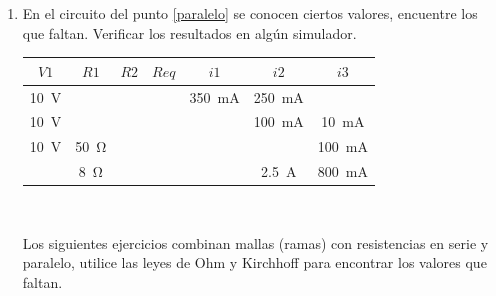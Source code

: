 \documentclass{article}
\begin{document}
\begin{enumerate}[label=\textbf{A.\arabic*}]
\begin{tabular}{|c|c|c|c|m{1.5cm}|c|c|}
\end{tabular}
\item En el circuito del punto \ref{paralelo} se conocen ciertos valores, encuentre los que faltan. Verificar los resultados en algún simulador. \\
\begin{tabular}{|c|c|m{0.8cm}|c|c|c|c|}
	\hline
	\rowcolor{headergray}
	${V1}$&$ {R1}$ &${R2}$ &$ {Req}$ & \quad ${{i}1}$ &$  {{i}2}$ &$ {{i}3} $\\ \hline
	\SI{10}{\volt}& & & & \SI{350}{\milli\ampere}&\SI{250}{\milli\ampere}& \\ \hline
	\SI{10}{\volt}& & & & &\SI{100}{\milli\ampere}&\SI{10}{\milli\ampere} \\ \hline
	\SI{10}{\volt}&\SI{50}{\ohm} & & & &&\SI{100}{\milli\ampere} \\ \hline
	 &\SI{8}{\ohm} & & & &\SI{2,5}{\ampere}&\SI{800}{\milli\ampere} \\ \hline
\end{tabular}
\\

\begin{tcolorbox}[enhanced,attach boxed title to top center={yshift=-3mm,yshifttext=-1mm},
	colback=black!5!white,colframe=white!75!black,colbacktitle=red!80!black,
	title= Atención , fonttitle=\bfseries,
	boxed title style={size=small,colframe=white,colback=black} ]
	Los siguientes ejercicios combinan mallas (ramas) con resistencias en serie y paralelo, utilice las leyes de Ohm y Kirchhoff para encontrar los valores que faltan. 
\end{tcolorbox}

\begin{minipage}{.40\textwidth}


\end{minipage}
\end{enumerate}
\end{document}
